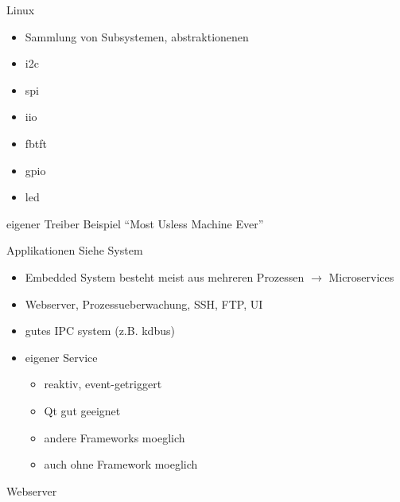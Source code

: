 \begin{frame}{Linux}
	\begin{itemize}
		\item Sammlung von Subsystemen, abstraktionenen
		\item i2c
		\item spi
		\item iio
		\item fbtft
		\item gpio
		\item led
	\end{itemize}
\end{frame}

\begin{frame}{eigener Treiber}
	Beispiel ``Most Usless Machine Ever''
\end{frame}

\begin{frame}{Applikationen}
	Siehe System
	\begin{itemize}
		\item Embedded System besteht meist aus mehreren Prozessen $\rightarrow$ Microservices
		\item Webserver, Prozessueberwachung, SSH, FTP, UI
		\item gutes IPC system (z.B. kdbus)
		\item eigener Service
		\begin{itemize}
			\item reaktiv, event-getriggert
			\item Qt gut geeignet
			\item andere Frameworks moeglich
			\item auch ohne Framework moeglich
		\end{itemize}
	\end{itemize}
\end{frame}

\begin{frame}{Webserver}
\end{frame}